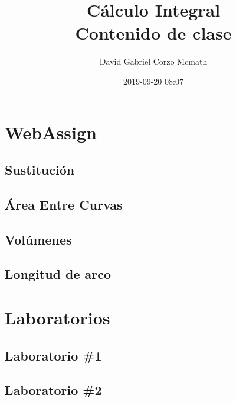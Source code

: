 \documentclass[openany]{book}
\author{David Gabriel Corzo Mcmath}
\title{\huge Cálculo Integral \normalsize \\  Contenido de clase }
\date{2019-09-20 08:07}
\begin{document}
\maketitle
\tableofcontents

\part{WebAssign}
\chapter{Sustitución}


\chapter{Área Entre Curvas}


\chapter{Volúmenes}


\chapter{Longitud de arco}



\part{Laboratorios}

\chapter{Laboratorio \#1}



\chapter{Laboratorio \#2}

\end{document}
